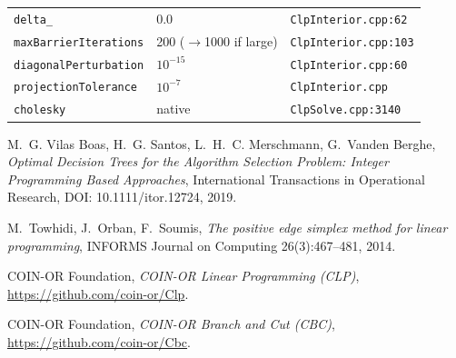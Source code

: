 \documentclass[11pt,a4paper]{article}
\begin{document}
\begin{center}
\begin{tabular}{@{}P{4cm}P{3cm}P{7cm}@{}}
  \texttt{delta\_}               & $0.0$                 & \texttt{ClpInterior.cpp:62} \\
  \texttt{maxBarrierIterations}  & 200 ($\to$1000 if large) & \texttt{ClpInterior.cpp:103} \\
  \texttt{diagonalPerturbation}  & $10^{-15}$            & \texttt{ClpInterior.cpp:60} \\
  \texttt{projectionTolerance}   & $10^{-7}$             & \texttt{ClpInterior.cpp} \\
  \texttt{cholesky}              & native                & \texttt{ClpSolve.cpp:3140} \\
  \bottomrule
\end{tabular}
\end{center}

\begin{thebibliography}{9}

  M.~G. Vilas Boas, H.~G. Santos, L.~H.~C. Merschmann, G.~Vanden Berghe,
  \textit{Optimal Decision Trees for the Algorithm Selection Problem:
  Integer Programming Based Approaches},
  International Transactions in Operational Research,
  DOI: 10.1111/itor.12724, 2019.

  M.~Towhidi, J.~Orban, F.~Soumis,
  \textit{The positive edge simplex method for linear programming},
  INFORMS Journal on Computing 26(3):467--481, 2014.

  COIN-OR Foundation,
  \textit{COIN-OR Linear Programming (CLP)},
  \url{https://github.com/coin-or/Clp}.

  COIN-OR Foundation,
  \textit{COIN-OR Branch and Cut (CBC)},
  \url{https://github.com/coin-or/Cbc}.

\end{thebibliography}
\end{document}
